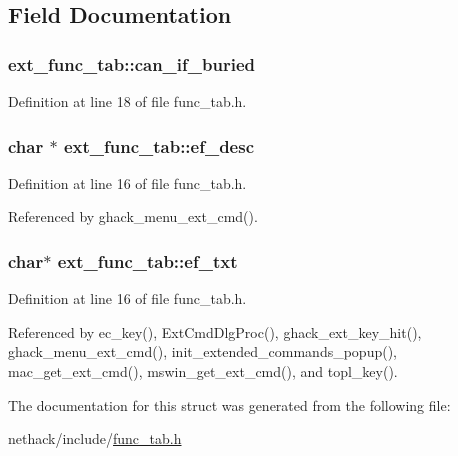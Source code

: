 \subsection{Field Documentation}
\hypertarget{structext__func__tab_a911ea713774beca031ae1e22305cb353}{
\subsubsection[{can\+\_\+if\+\_\+buried}]{ ext\+\_\+func\+\_\+tab\+::can\+\_\+if\+\_\+buried}}\label{structext__func__tab_a911ea713774beca031ae1e22305cb353}


Definition at line 18 of file func\+\_\+tab.\+h.

\hypertarget{structext__func__tab_ae97246b7cf51ab18cd3b612c05e2b7c1}{
\subsubsection[{ef\+\_\+desc}]{ char $\ast$ ext\+\_\+func\+\_\+tab\+::ef\+\_\+desc}}\label{structext__func__tab_ae97246b7cf51ab18cd3b612c05e2b7c1}


Definition at line 16 of file func\+\_\+tab.\+h.



Referenced by ghack\+\_\+menu\+\_\+ext\+\_\+cmd().

\hypertarget{structext__func__tab_a1c6b81a9ba3a70826ea2f1c2eacc089e}{
\subsubsection[{ef\+\_\+txt}]{ char$\ast$ ext\+\_\+func\+\_\+tab\+::ef\+\_\+txt}}\label{structext__func__tab_a1c6b81a9ba3a70826ea2f1c2eacc089e}


Definition at line 16 of file func\+\_\+tab.\+h.



Referenced by ec\+\_\+key(), Ext\+Cmd\+Dlg\+Proc(), ghack\+\_\+ext\+\_\+key\+\_\+hit(), ghack\+\_\+menu\+\_\+ext\+\_\+cmd(), init\+\_\+extended\+\_\+commands\+\_\+popup(), mac\+\_\+get\+\_\+ext\+\_\+cmd(), mswin\+\_\+get\+\_\+ext\+\_\+cmd(), and topl\+\_\+key().



The documentation for this struct was generated from the following file\+:\begin{DoxyCompactItemize}
\item 
nethack/include/\hyperlink{func__tab_8h}{func\+\_\+tab.\+h}\end{DoxyCompactItemize}
